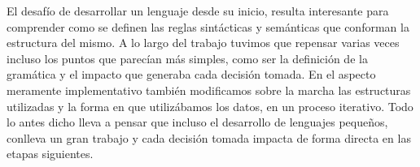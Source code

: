 El desaf\'io de desarrollar un lenguaje desde su inicio, resulta interesante para comprender como se definen las reglas sint\'acticas y sem\'anticas que conforman la estructura del mismo.
A lo largo del trabajo tuvimos que repensar varias veces incluso los puntos que parec\'ian m\'as simples, como ser la definici\'on de la gram\'atica y el impacto que generaba cada decisi\'on tomada.
En el aspecto meramente implementativo tambi\'en modificamos sobre la marcha las estructuras utilizadas y la forma en que utiliz\'abamos los datos, en un proceso iterativo.
Todo lo antes dicho lleva a pensar que incluso el desarrollo de lenguajes peque\~nos, conlleva un gran trabajo y cada decisi\'on tomada impacta de forma directa en las etapas siguientes.
